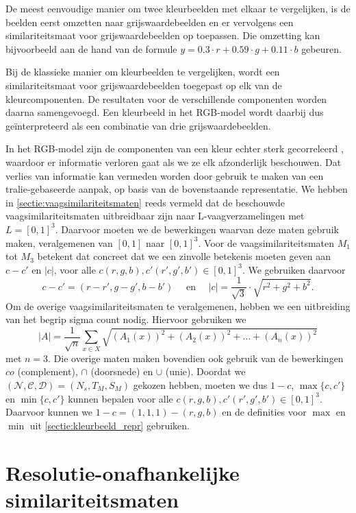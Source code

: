 De meest eenvoudige manier om twee kleurbeelden met elkaar te vergelijken, is de beelden eerst omzetten naar 
grijswaardebeelden en er vervolgens een similariteitsmaat voor grijswaardebeelden op toepassen. Die omzetting 
kan bijvoorbeeld aan de hand van de formule $y = 0.3 \cdot r + 0.59 \cdot g + 0.11 \cdot b$ 
\cite{debaets:similariteitsmaten_voor_kleurbeelden} gebeuren.

Bij de klassieke manier om kleurbeelden te vergelijken, wordt een similariteitsmaat 
voor grijswaardebeelden toegepast op elk van de kleurcomponenten. De resultaten voor de
verschillende componenten worden daarna samengevoegd. Een kleurbeeld in het RGB-model wordt daarbij
dus ge\"interpreteerd als een combinatie van drie grijswaardebeelden. 

In het RGB-model zijn de componenten van een kleur echter sterk gecorreleerd 
\cite{sharma:digital_color_imaging}, waardoor er
informatie verloren gaat als we ze elk afzonderlijk beschouwen. Dat verlies van informatie kan vermeden
worden door gebruik te maken van een tralie-gebaseerde aanpak,
op basis van de bovenstaande representatie.
We hebben in \ref{sectie:vaagsimilariteitsmaten} reeds vermeld dat de beschouwde 
vaagsimilariteitsmaten uitbreidbaar zijn naar L-vaag\-ver\-za\-me\-ling\-en met
$L=[0,1]^3$. Daarvoor moeten we de bewerkingen waarvan deze maten gebruik maken, veralgemenen van 
$[0,1]$ naar $[0,1]^3$. 
Voor de vaagsimilariteitsmaten $M_1$ tot $M_3$ betekent dat concreet dat we een zinvolle betekenis 
moeten geven aan $c - c'$ en $|c|$, voor alle $c(r,g,b),c'(r',g',b') \in [0,1]^3$. We gebruiken
daarvoor 
$$
c - c' = (r-r',g-g',b-b') \quad \textrm{ en } \quad |c| = \frac{1}{\sqrt{3}} \cdot \sqrt{r^2 + g^2 + b^2}.
$$
Om de overige vaagsimilariteitsmaten te veralgemenen, hebben we een uitbreiding van het
begrip sigma count nodig. Hiervoor gebruiken we
$$
|A|=\frac{1}{\sqrt{n}}\sum_{x \in X}\sqrt{(A_1(x))^2+(A_2(x))^2+\ldots+(A_n(x))^2}
$$
met $n=3$. Die overige maten maken bovendien ook gebruik van de bewerkingen $co$ (complement), 
$\cap$ (doorsnede) en $\cup$ (unie). Doordat we 
$(\mathcal{N},\mathcal{C},\mathcal{D})=(N_s,T_M,S_M)$ gekozen hebben, moeten we
dus $1 - c$, $\max \{c,c'\}$ en $\min \{c,c'\}$ kunnen bepalen voor alle 
$c(r,g,b),c'(r',g',b') \in [0,1]^3$. Daarvoor kunnen we $1 - c = (1,1,1) - (r,g,b)$ en de
definities voor $\max$ en $\min$ uit \ref{sectie:kleurbeeld_repr} gebruiken.


\section{Resolutie-onafhankelijke similariteitsmaten}
\label{sectie:res-onafh}


